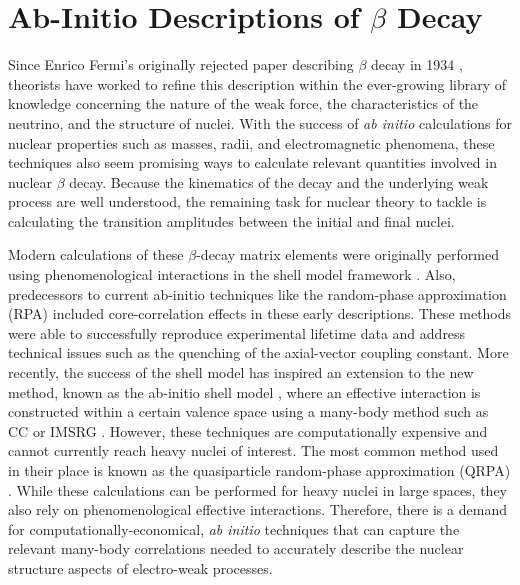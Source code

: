 \documentclass[../thesis.tex]{subfiles}
\begin{document}
\section{Ab-Initio Descriptions of $\beta$ Decay}

Since Enrico Fermi's originally rejected paper describing $\beta$ decay in 1934 \cite{FERMI1934,WILSON1968}, theorists have worked to refine this description within the ever-growing library of knowledge concerning the nature of the weak force, the characteristics of the neutrino, and the structure of nuclei.  With the success of \emph{ab initio} calculations for nuclear properties such as masses, radii, and electromagnetic phenomena, these techniques also seem promising ways to calculate relevant quantities involved in nuclear $\beta$ decay.  Because the kinematics of the decay and the underlying weak process are well understood, the remaining task for nuclear theory to tackle is calculating the transition amplitudes between the initial and final nuclei.

Modern calculations of these $\beta$-decay matrix elements were originally performed using phenomenological interactions in the shell model framework \cite{WILDENTHAL1983,BROWN1983,WARBURTON1992,ORMAND1995}.  Also, predecessors to current ab-initio techniques like the random-phase approximation (RPA) \cite{TOWNER1979} included core-correlation effects in these early descriptions.  These methods were able to successfully reproduce experimental lifetime data and address technical issues such as the quenching of the axial-vector coupling constant.  More recently, the success of the shell model has inspired an extension to the new method, known as the ab-initio shell model \cite{BARRETT2013131}, where an effective interaction is constructed within a certain valence space using a many-body method such as CC \cite{JANSEN2014} or IMSRG \cite{BOGNER2014}.  However, these techniques are computationally expensive and cannot currently reach heavy nuclei of interest.  The most common method used in their place is known as the quasiparticle random-phase approximation (QRPA) \cite{SUHONEN2013153,ENGEL2015}.  While these calculations can be performed for heavy nuclei in large spaces, they also rely on phenomenological effective interactions.  Therefore, there is a demand for computationally-economical, \emph{ab initio} techniques that can capture the relevant many-body correlations needed to accurately describe the nuclear structure aspects of electro-weak processes.
\end{document}
